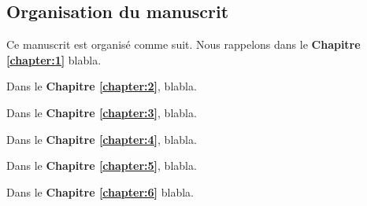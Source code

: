 \begin{resume_fr}
\section*{Organisation du manuscrit}

Ce manuscrit est organisé comme suit.
Nous rappelons dans le \textbf{Chapitre \ref{chapter:1}} blabla.

Dans le \textbf{Chapitre \ref{chapter:2}}, blabla.

Dans le \textbf{Chapitre \ref{chapter:3}}, blabla.

Dans le \textbf{Chapitre \ref{chapter:4}}, blabla.

Dans le \textbf{Chapitre \ref{chapter:5}}, blabla.

Dans le \textbf{Chapitre \ref{chapter:6}} blabla.

\end{resume_fr}
